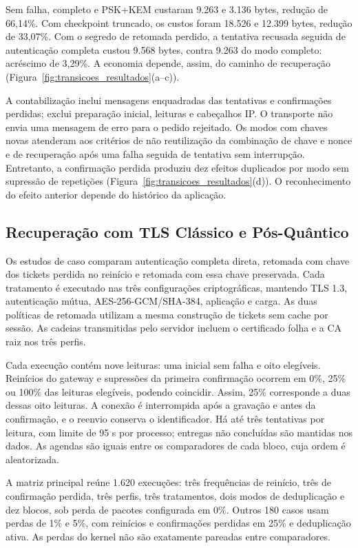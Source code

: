 Sem falha, completo e PSK+KEM custaram 9.263 e 3.136 bytes, redução de 66,14\%. Com checkpoint truncado, os custos foram 18.526 e 12.399 bytes, redução de 33,07\%. Com o segredo de retomada perdido, a tentativa recusada seguida de autenticação completa custou 9.568 bytes, contra 9.263 do modo completo: acréscimo de 3,29\%. A economia depende, assim, do caminho de recuperação (Figura~\ref{fig:transicoes_resultados}(a--c)).

A contabilização inclui mensagens enquadradas das tentativas e confirmações perdidas; exclui preparação inicial, leituras e cabeçalhos IP. O transporte não envia uma mensagem de erro para o pedido rejeitado. Os modos com chaves novas atenderam aos critérios de não reutilização da combinação de chave e nonce e de recuperação após uma falha seguida de tentativa sem interrupção. Entretanto, a confirmação perdida produziu dez efeitos duplicados por modo sem supressão de repetições (Figura~\ref{fig:transicoes_resultados}(d)). O reconhecimento do efeito anterior depende do histórico da aplicação.

\subsection{Recuperação com TLS Clássico e Pós-Quântico}
\label{sec:continuidade_tls}

Os estudos de caso comparam autenticação completa direta, retomada com chave dos tickets perdida no reinício e retomada com essa chave preservada. Cada tratamento é executado nas três configurações criptográficas, mantendo TLS 1.3, autenticação mútua, AES-256-GCM/SHA-384, aplicação e carga. As duas políticas de retomada utilizam a mesma construção de tickets sem cache por sessão. As cadeias transmitidas pelo servidor incluem o certificado folha e a CA raiz nos três perfis.

Cada execução contém nove leituras: uma inicial sem falha e oito elegíveis. Reinícios do gateway e supressões da primeira confirmação ocorrem em 0\%, 25\% ou 100\% das leituras elegíveis, podendo coincidir. Assim, 25\% corresponde a duas dessas oito leituras. A conexão é interrompida após a gravação e antes da confirmação, e o reenvio conserva o identificador. Há até três tentativas por leitura, com limite de 95 s por processo; entregas não concluídas são mantidas nos dados. As agendas são iguais entre os comparadores de cada bloco, cuja ordem é aleatorizada.

A matriz principal reúne 1.620 execuções: três frequências de reinício, três de confirmação perdida, três perfis, três tratamentos, dois modos de deduplicação e dez blocos, sob perda de pacotes configurada em 0\%. Outros 180 casos usam perdas de 1\% e 5\%, com reinícios e confirmações perdidas em 25\% e deduplicação ativa. As perdas do kernel não são exatamente pareadas entre comparadores.

